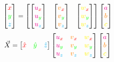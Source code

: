 \documentclass[preview]{standalone}
\begin{document}
$$\begin{bmatrix}\textcolor{red}{x}\\\textcolor{green}{y}\\\textcolor{cyan}{z}\end{bmatrix} = \begin{bmatrix}
\begin{bmatrix}\textcolor{magenta}{u}_{\textcolor{red}{x}}\\\textcolor{magenta}{u}_{\textcolor{green}{y}}\\\textcolor{magenta}{u}_{\textcolor{cyan}{z}}\end{bmatrix} &
\begin{bmatrix}\textcolor{orange}{v}_{\textcolor{red}{x}}\\\textcolor{orange}{v}_{\textcolor{green}{y}}\\\textcolor{orange}{v}_{\textcolor{cyan}{z}}\end{bmatrix} &
\begin{bmatrix}\textcolor{yellow}{w}_{\textcolor{red}{x}}\\\textcolor{yellow}{w}_{\textcolor{green}{y}}\\\textcolor{yellow}{w}_{\textcolor{cyan}{z}}\end{bmatrix}
\end{bmatrix}\begin{bmatrix}\textcolor{magenta}{a}\\\textcolor{orange}{b}\\\textcolor{yellow}{c}\end{bmatrix}$$
$$\vec{X} = \begin{bmatrix}\textcolor{red}{\hat{x}}&\textcolor{green}{\hat{y}}&\textcolor{cyan}{\hat{z}}\end{bmatrix}\begin{bmatrix}
\textcolor{magenta}{u}_{\textcolor{red}{x}}&\textcolor{orange}{v}_{\textcolor{red}{x}}&\textcolor{yellow}{w}_{\textcolor{red}{x}}\\
\textcolor{magenta}{u}_{\textcolor{green}{y}}&\textcolor{orange}{v}_{\textcolor{green}{y}}&\textcolor{yellow}{w}_{\textcolor{green}{y}}\\
\textcolor{magenta}{u}_{\textcolor{cyan}{z}}&\textcolor{orange}{v}_{\textcolor{cyan}{z}}&\textcolor{yellow}{w}_{\textcolor{cyan}{z}}
\end{bmatrix}\begin{bmatrix}\textcolor{magenta}{a}\\\textcolor{orange}{b}\\\textcolor{yellow}{c}\end{bmatrix}$$
\end{document}
